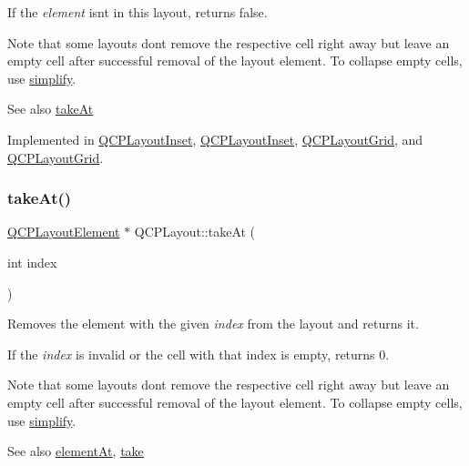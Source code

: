If the {\itshape element} isn\textquotesingle{}t in this layout, returns false.

Note that some layouts don\textquotesingle{}t remove the respective cell right away but leave an empty cell after successful removal of the layout element. To collapse empty cells, use \hyperlink{class_q_c_p_layout_a41e6ac049143866e8f8b4964efab01b2}{simplify}.

\begin{DoxySeeAlso}{See also}
\hyperlink{class_q_c_p_layout_a5a79621fa0a6eabb8b520cfc04fb601a}{take\+At} 
\end{DoxySeeAlso}


Implemented in \hyperlink{class_q_c_p_layout_inset_af7f13cc369f8190b5e7e17d5f39dfe1c}{Q\+C\+P\+Layout\+Inset}, \hyperlink{class_q_c_p_layout_inset_a1daf9fe747380dcd3cf8ef9deb470dc9}{Q\+C\+P\+Layout\+Inset}, \hyperlink{class_q_c_p_layout_grid_aee961c2eb6cf8a85dcbc5a7d7b6c1a00}{Q\+C\+P\+Layout\+Grid}, and \hyperlink{class_q_c_p_layout_grid_a97b7dbaae963fc34bd7427318dab8861}{Q\+C\+P\+Layout\+Grid}.

\mbox{\label{class_q_c_p_layout_a5a79621fa0a6eabb8b520cfc04fb601a}} 
\subsubsection{\texorpdfstring{take\+At()}{takeAt()}}
{\footnotesize\ttfamily \hyperlink{class_q_c_p_layout_element}{Q\+C\+P\+Layout\+Element} $\ast$ Q\+C\+P\+Layout\+::take\+At (\begin{DoxyParamCaption}\item[{int}]{index }\end{DoxyParamCaption})\hspace{0.3cm}{\ttfamily [pure virtual]}}

Removes the element with the given {\itshape index} from the layout and returns it.

If the {\itshape index} is invalid or the cell with that index is empty, returns 0.

Note that some layouts don\textquotesingle{}t remove the respective cell right away but leave an empty cell after successful removal of the layout element. To collapse empty cells, use \hyperlink{class_q_c_p_layout_a41e6ac049143866e8f8b4964efab01b2}{simplify}.

\begin{DoxySeeAlso}{See also}
\hyperlink{class_q_c_p_layout_afa73ca7d859f8a3ee5c73c9b353d2a56}{element\+At}, \hyperlink{class_q_c_p_layout_ada26cd17e56472b0b4d7fbbc96873e4c}{take} 
\end{DoxySeeAlso}



